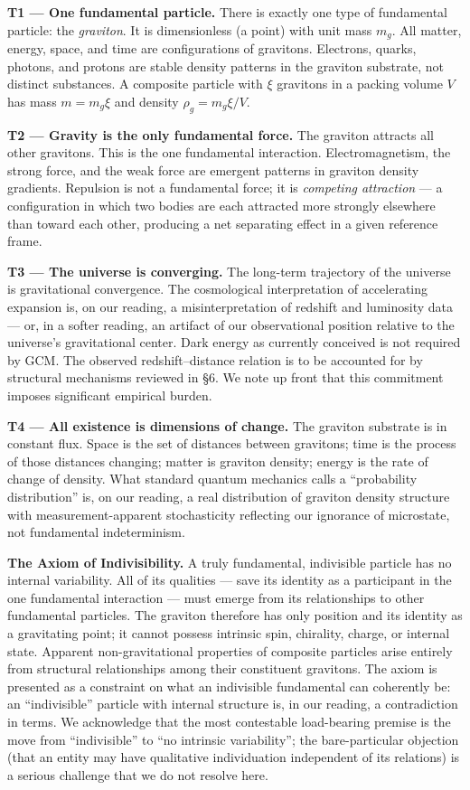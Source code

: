 \documentclass[12pt]{article}
\theoremstyle{definition}
\theoremstyle{remark}
\begin{document}
\textbf{T1 --- One fundamental particle.} There is exactly one type of
fundamental particle: the \emph{graviton}. It is dimensionless (a point)
with unit mass \(m_g\). All matter, energy, space, and time are
configurations of gravitons. Electrons, quarks, photons, and protons are
stable density patterns in the graviton substrate, not distinct
substances. A composite particle with \(\xi\) gravitons in a packing
volume \(V\) has mass \(m = m_g\xi\) and density \(\rho_g = m_g\xi/V\).

\textbf{T2 --- Gravity is the only fundamental force.} The graviton
attracts all other gravitons. This is the one fundamental interaction.
Electromagnetism, the strong force, and the weak force are emergent
patterns in graviton density gradients. Repulsion is not a fundamental
force; it is \emph{competing attraction} --- a configuration in which
two bodies are each attracted more strongly elsewhere than toward each
other, producing a net separating effect in a given reference frame.

\textbf{T3 --- The universe is converging.} The long-term trajectory of
the universe is gravitational convergence. The cosmological
interpretation of accelerating expansion is, on our reading, a
misinterpretation of redshift and luminosity data --- or, in a softer
reading, an artifact of our observational position relative to the
universe's gravitational center. Dark energy as currently conceived is
not required by GCM. The observed redshift--distance relation is to be
accounted for by structural mechanisms reviewed in §6. We note up front
that this commitment imposes significant empirical burden.

\textbf{T4 --- All existence is dimensions of change.} The graviton
substrate is in constant flux. Space is the set of distances between
gravitons; time is the process of those distances changing; matter is
graviton density; energy is the rate of change of density. What standard
quantum mechanics calls a ``probability distribution'' is, on our
reading, a real distribution of graviton density structure with
measurement-apparent stochasticity reflecting our ignorance of
microstate, not fundamental indeterminism.

\textbf{The Axiom of Indivisibility.} A truly fundamental, indivisible
particle has no internal variability. All of its qualities --- save its
identity as a participant in the one fundamental interaction --- must
emerge from its relationships to other fundamental particles. The
graviton therefore has only position and its identity as a gravitating
point; it cannot possess intrinsic spin, chirality, charge, or internal
state. Apparent non-gravitational properties of composite particles
arise entirely from structural relationships among their constituent
gravitons. The axiom is presented as a constraint on what an indivisible
fundamental can coherently be: an ``indivisible'' particle with internal
structure is, in our reading, a contradiction in terms. We acknowledge
that the most contestable load-bearing premise is the move from
``indivisible'' to ``no intrinsic variability''; the bare-particular
objection (that an entity may have qualitative individuation independent
of its relations) is a serious challenge that we do not resolve here.
\end{document}
